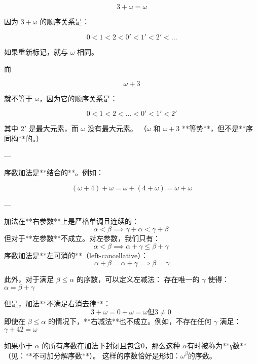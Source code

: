 \[
3 + \omega = \omega
\]

因为 \(3 + \omega\) 的顺序关系是：

\[
0 < 1 < 2 < 0' < 1' < 2' < \dots
\]

如果重新标记，就与 \(\omega\) 相同。  

而

\[
\omega + 3
\]

就不等于 \(\omega\)，因为它的顺序关系是：

\[
0 < 1 < 2 < \dots < 0' < 1' < 2'
\]

其中 \(2'\) 是最大元素，而 \(\omega\) 没有最大元素。  
（\(\omega\) 和 \(\omega + 3\) **等势**，但不是**序同构**的。）

---

序数加法是**结合的**。例如：

\[
(\omega + 4) + \omega = \omega + (4 + \omega) = \omega + \omega
\]

---

加法在**右参数**上是严格单调且连续的：
\[
\alpha < \beta \implies \gamma + \alpha < \gamma + \beta~
\]
但对于**左参数**不成立。对左参数，我们只有：
\[
\alpha < \beta \implies \alpha + \gamma \leq \beta + \gamma~
\]
序数加法是**左可消的**（left-cancellative）：  
\[
\alpha + \beta = \alpha + \gamma \implies \beta = \gamma
\]

此外，对于满足 \(\beta \leq \alpha\) 的序数，可以定义左减法：  
存在唯一的 \(\gamma\) 使得：\(\alpha = \beta + \gamma\)

但是，加法**不满足右消去律**：
\[3 + \omega = 0 + \omega = \omega \text{但}3 \neq 0~\]
即使在 \(\beta \leq \alpha\) 的情况下，**右减法**也不成立。例如，不存在任何 \(\gamma\) 满足：\(\gamma + 42 = \omega\)

如果小于 \(\alpha\) 的所有序数在加法下封闭且包含0，那么这种 \(\alpha\)有时被称为**γ数**（见：**不可加分解序数**）。  这样的序数恰好是形如：\(\omega^\beta\)的序数。